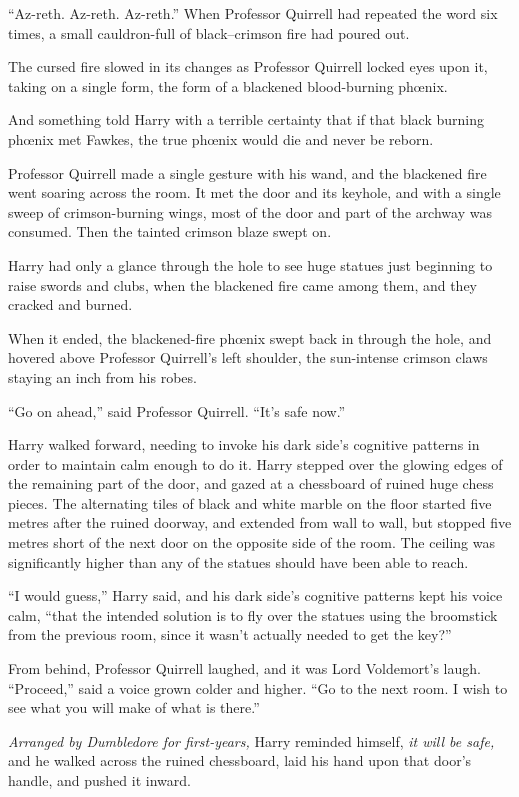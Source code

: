 “Az-reth. Az-reth. Az-reth.” When Professor Quirrell had repeated the word six times, a small cauldron-full of black–crimson fire had poured out.

The cursed fire slowed in its changes as Professor Quirrell locked eyes upon it, taking on a single form, the form of a blackened blood-burning phœnix.

And something told Harry with a terrible certainty that if that black burning phœnix met Fawkes, the true phœnix would die and never be reborn.

Professor Quirrell made a single gesture with his wand, and the blackened fire went soaring across the room. It met the door and its keyhole, and with a single sweep of crimson-burning wings, most of the door and part of the archway was consumed. Then the tainted crimson blaze swept on.

Harry had only a glance through the hole to see huge statues just beginning to raise swords and clubs, when the blackened fire came among them, and they cracked and burned.

When it ended, the blackened-fire phœnix swept back in through the hole, and hovered above Professor Quirrell’s left shoulder, the sun-intense crimson claws staying an inch from his robes.

“Go on ahead,” said Professor Quirrell. “It’s safe now.”

Harry walked forward, needing to invoke his dark side’s cognitive patterns in order to maintain calm enough to do it. Harry stepped over the glowing edges of the remaining part of the door, and gazed at a chessboard of ruined huge chess pieces. The alternating tiles of black and white marble on the floor started five metres after the ruined doorway, and extended from wall to wall, but stopped five metres short of the next door on the opposite side of the room. The ceiling was significantly higher than any of the statues should have been able to reach.

“I would guess,” Harry said, and his dark side’s cognitive patterns kept his voice calm, “that the intended solution is to fly over the statues using the broomstick from the previous room, since it wasn’t actually needed to get the key?”

From behind, Professor Quirrell laughed, and it was Lord Voldemort’s laugh. “Proceed,” said a voice grown colder and higher. “Go to the next room. I wish to see what you will make of what is there.”

\emph{Arranged by Dumbledore for first-years,} Harry reminded himself, \emph{it \emph{will} be safe,} and he walked across the ruined chessboard, laid his hand upon that door’s handle, and pushed it inward.

